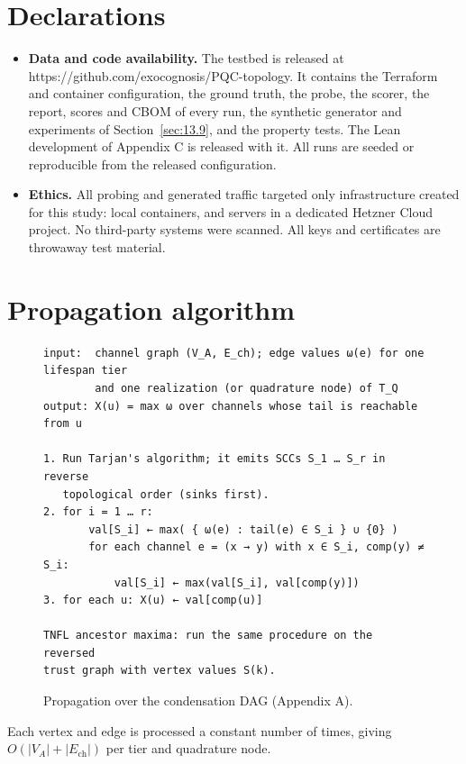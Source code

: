 \documentclass[conference]{IEEEtran}
\begin{document}
\section*{Declarations}

\begin{itemize}
\item \textbf{Data and code availability.} The testbed is released at https://github.com/exocognosis/PQC-topology. It contains the Terraform and container configuration, the ground truth, the probe, the scorer, the report, scores and CBOM of every run, the synthetic generator and experiments of Section~\ref{sec:13.9}, and the property tests. The Lean development of Appendix C is released with it. All runs are seeded or reproducible from the released configuration.
\item \textbf{Ethics.} All probing and generated traffic targeted only infrastructure created for this study: local containers, and servers in a dedicated Hetzner Cloud project. No third-party systems were scanned. All keys and certificates are throwaway test material.
\end{itemize}

\appendices

\section{Propagation algorithm}\label{app:A}

\begin{figure}[!t]
\begin{Verbatim}[fontsize=\footnotesize, frame=lines]
input:  channel graph (V_A, E_ch); edge values ω(e) for one lifespan tier
        and one realization (or quadrature node) of T_Q
output: X(u) = max ω over channels whose tail is reachable from u

1. Run Tarjan's algorithm; it emits SCCs S_1 … S_r in reverse
   topological order (sinks first).
2. for i = 1 … r:
       val[S_i] ← max( { ω(e) : tail(e) ∈ S_i } ∪ {0} )
       for each channel e = (x → y) with x ∈ S_i, comp(y) ≠ S_i:
           val[S_i] ← max(val[S_i], val[comp(y)])
3. for each u: X(u) ← val[comp(u)]

TNFL ancestor maxima: run the same procedure on the reversed
trust graph with vertex values S(k).
\end{Verbatim}
\caption{Propagation over the condensation DAG (Appendix A).}\label{fig:alg}
\end{figure}

Each vertex and edge is processed a constant number of times, giving $O(|V_A| + |E_{\mathrm{ch}}|)$ per tier and quadrature node.
\end{document}
